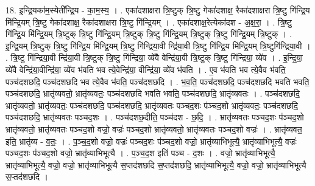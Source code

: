 \documentclass[17pt]{extarticle}
\begin{document}
18. इ॒न्द्रि॒यका॑म॒स्येती᳚न्द्रि॒य - का॒म॒स्य॒ । . एका॑दशाक्षरा त्रि॒ष्टुक् त्रि॒ष्टु गेका॑दशाक्ष॒ रैका॑दशाक्षरा त्रि॒ष्टु गि॑न्द्रि॒य मि॑न्द्रि॒यम् त्रि॒ष्टु गेका॑दशाक्ष॒ रैका॑दशाक्षरा त्रि॒ष्टु गि॑न्द्रि॒यम् । . एका॑दशाक्ष॒रेत्येका॑दश - अ॒क्ष॒रा॒ । . त्रि॒ष्टु गि॑न्द्रि॒य मि॑न्द्रि॒यम् त्रि॒ष्टुक् त्रि॒ष्टु गि॑न्द्रि॒यम् त्रि॒ष्टुक् त्रि॒ष्टु गि॑न्द्रि॒यम् त्रि॒ष्टुक् त्रि॒ष्टु गि॑न्द्रि॒यम् त्रि॒ष्टुक् । . इ॒न्द्रि॒यम् त्रि॒ष्टुक् त्रि॒ष्टु गि॑न्द्रि॒य मि॑न्द्रि॒यम् त्रि॒ष्टु गि॑न्द्रिया॒वी न्द्रि॑या॒वी त्रि॒ष्टु गि॑न्द्रि॒य मि॑न्द्रि॒यम् त्रि॒ष्टुगि॑न्द्रिया॒वी । . त्रि॒ष्टु गि॑न्द्रिया॒वी न्द्रि॑या॒वी त्रि॒ष्टुक् त्रि॒ष्टु गि॑न्द्रिया॒ व्ये॑वै वेन्द्रि॑या॒वी त्रि॒ष्टुक् त्रि॒ष्टु गि॑न्द्रिया॒ व्ये॑व । . इ॒न्द्रि॒या॒ व्ये॑वै वेन्द्रि॑या॒वीन्द्रि॑या॒ व्ये॑व भ॑वति भव त्ये॒वेन्द्रि॑या॒ वीन्द्रि॑या॒ व्ये॑व भ॑वति । . ए॒व भ॑वति भव त्ये॒वैव भ॑वति॒ पञ्च॑दशछदि॒ पञ्च॑दशछदि भव त्ये॒वैव भ॑वति॒ पञ्च॑दशछदि । . भ॒व॒ति॒ पञ्च॑दशछदि॒ पञ्च॑दशछदि भवति भवति॒ पञ्च॑दशछदि॒ भ्रातृ॑व्यवतो॒ भ्रातृ॑व्यवतः॒ पञ्च॑दशछदि भवति भवति॒ पञ्च॑दशछदि॒ भ्रातृ॑व्यवतः । . पञ्च॑दशछदि॒ भ्रातृ॑व्यवतो॒ भ्रातृ॑व्यवतः॒ पञ्च॑दशछदि॒ पञ्च॑दशछदि॒ भ्रातृ॑व्यवतः पञ्चद॒शः प॑ञ्चद॒शो भ्रातृ॑व्यवतः॒ पञ्च॑दशछदि॒ पञ्च॑दशछदि॒ भ्रातृ॑व्यवतः पञ्चद॒शः । . पञ्च॑दशछ॒दीति॒ पञ्च॑दश - छ॒दि॒ । . भ्रातृ॑व्यवतः पञ्चद॒शः प॑ञ्चद॒शो भ्रातृ॑व्यवतो॒ भ्रातृ॑व्यवतः पञ्चद॒शो वज्रो॒ वज्रः॑ पञ्चद॒शो भ्रातृ॑व्यवतो॒ भ्रातृ॑व्यवतः पञ्चद॒शो वज्रः॑ । . भ्रातृ॑व्यवत॒ इति॒ भ्रातृ॑व्य - व॒तः॒ । . प॒ञ्च॒द॒शो वज्रो॒ वज्रः॑ पञ्चद॒शः प॑ञ्चद॒शो वज्रो॒ भ्रातृ॑व्याभिभूत्यै॒ भ्रातृ॑व्याभिभूत्यै॒ वज्रः॑ पञ्चद॒शः प॑ञ्चद॒शो वज्रो॒ भ्रातृ॑व्याभिभूत्यै । . प॒ञ्च॒द॒श इति॑ पञ्च - द॒शः । . वज्रो॒ भ्रातृ॑व्याभिभूत्यै॒ भ्रातृ॑व्याभिभूत्यै॒ वज्रो॒ वज्रो॒ भ्रातृ॑व्याभिभूत्यै स॒प्तद॑शछदि स॒प्तद॑शछदि॒ भ्रातृ॑व्याभिभूत्यै॒ वज्रो॒ वज्रो॒ भ्रातृ॑व्याभिभूत्यै स॒प्तद॑शछदि । \newline
\end{document}
